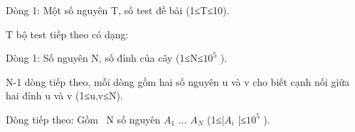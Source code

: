 Dòng 1: Một số nguyên T, số test đề bài (1≤T≤10).

T bộ test tiếp theo có dạng:

Dòng 1: Số nguyên N, số đỉnh của cây (1≤N≤$10^{5}$ ).

N-1 dòng tiếp theo, mỗi dòng gồm hai số nguyên u và v cho biết cạnh nối giữa hai đỉnh u và v (1≤u,v≤N).

Dòng tiếp theo: Gồm  N số nguyên $A_{1}$ ... $A_{N}$ (1≤|$A_{i}$ |≤$10^{5}$ ).